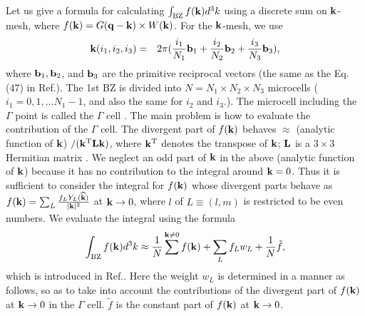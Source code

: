 \documentclass[a4paper,10pt,epsf,fleqn]{article}
\newcommand{\bfq}{{\bf q}}
\newcommand{\bfk}{{\bf k}}
\begin{document}
Let us give a formula for calculating
$\int_{\rm BZ} f(\bfk) d^3k$ using a discrete sum on $\bfk$-mesh,
where $f(\bfk)=G(\bfq-\bfk) \times W(\bfk)$.
For the $\bfk$-mesh, we use
\begin{eqnarray}
{\bf k}(i_1,i_2,i_3) &=& 2 \pi (\frac{i_1}{N_1} {\bf b}_1 
+ \frac{i_2}{N_2} {\bf b}_2 + \frac{i_3}{N_3} {\bf b}_3),
\label{kmesh}
\nonumber
\end{eqnarray}
where ${\bf b}_1, {\bf b}_2$, and ${\bf b}_3$ are the primitive reciprocal
vectors (the same as the Eq.(47) in Ref.\cite{kotani_quasiparticle_2007}). 
The 1st BZ is divided into $N=N_1 \times N_2 \times N_3$
microcells ($i_1=0,1,... N_1-1$, and also the same for $i_2$ and $i_3$.).
The microcell including the $\Gamma$ point is called the
$\Gamma$ cell \cite{freysoldt_dielectric_2007}.
The main problem is how to evaluate the contribution of the $\Gamma$ cell.
The divergent part of $f(\bfk)$ behaves $\approx$ (analytic function of $\bfk$) 
$/(\bfk^{\rm T}{\bf L}\bfk)$, 
where $\bfk^{\rm T}$ denotes the transpose of $\bfk$; ${\bf L}$
is a $3\times3$ Hermitian matrix \cite{friedrich_efficient_2010}. 
We neglect an odd part of $\bfk$ in the above (analytic function of $\bfk$)
because it has no contribution to the integral around $\bfk=0$.
Thus it is sufficient to consider the integral for $f(\bfk)$ whose divergent parts behave
as $f(\bfk)=\sum_L \frac{f_L Y_L(\widehat{\bfk})}{|\bfk|^2}$ at $\bfk \to 0$, 
where $l$ of $L\equiv(l,m)$ is restricted to be even numbers.
We evaluate the integral using the formula
\begin{eqnarray}
\int_{\rm BZ} f(\bfk) d^3k \approx \frac{1}{N}\sum^{\bfk \ne 0} f(\bfk)
 + \sum_L f_L w_L + \frac{1}{N} \tilde{f},
\label{eq:bzint0}
\end{eqnarray}
which is introduced in Ref.\cite{freysoldt_dielectric_2007}. 
Here the weight $w_L$ is determined in a manner as follows,
so as to take into account the contributions of the divergent part of $f(\bfk)$
at $\bfk \to 0$ in the $\Gamma$ cell.
$\tilde{f}$ is the constant part of $f(\bfk)$ at $\bfk \to 0$.
\end{document}
